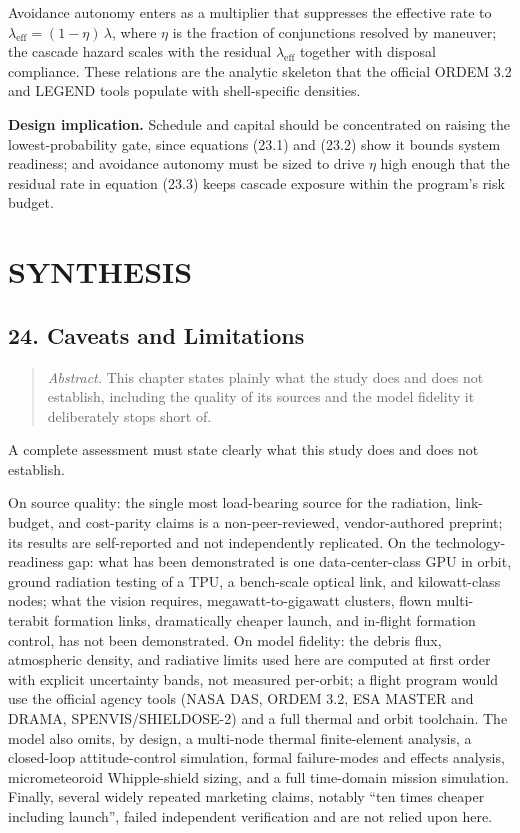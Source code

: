 \documentclass[
  11pt,
  openany,
  oneside]{book}
\begin{document}
Avoidance autonomy enters as a multiplier that suppresses the effective
rate to \(\lambda_{\text{eff}} = (1-\eta)\,\lambda\), where \(\eta\) is
the fraction of conjunctions resolved by maneuver; the cascade hazard
scales with the residual \(\lambda_{\text{eff}}\) together with disposal
compliance. These relations are the analytic skeleton that the official
ORDEM 3.2 and LEGEND tools populate with shell-specific densities.

\textbf{Design implication.} Schedule and capital should be concentrated
on raising the lowest-probability gate, since equations (23.1) and
(23.2) show it bounds system readiness; and avoidance autonomy must be
sized to drive \(\eta\) high enough that the residual rate in equation
(23.3) keeps cascade exposure within the program's risk budget.

\part{SYNTHESIS}\label{synthesis}

\chapter{24. Caveats and Limitations}\label{caveats-and-limitations}

\begin{quote}
\emph{Abstract.} This chapter states plainly what the study does and
does not establish, including the quality of its sources and the model
fidelity it deliberately stops short of.
\end{quote}

A complete assessment must state clearly what this study does and does
not establish.

On source quality: the single most load-bearing source for the
radiation, link-budget, and cost-parity claims is a non-peer-reviewed,
vendor-authored preprint; its results are self-reported and not
independently replicated. On the technology-readiness gap: what has been
demonstrated is one data-center-class GPU in orbit, ground radiation
testing of a TPU, a bench-scale optical link, and kilowatt-class nodes;
what the vision requires, megawatt-to-gigawatt clusters, flown
multi-terabit formation links, dramatically cheaper launch, and
in-flight formation control, has not been demonstrated. On model
fidelity: the debris flux, atmospheric density, and radiative limits
used here are computed at first order with explicit uncertainty bands,
not measured per-orbit; a flight program would use the official agency
tools (NASA DAS, ORDEM 3.2, ESA MASTER and DRAMA, SPENVIS/SHIELDOSE-2)
and a full thermal and orbit toolchain. The model also omits, by design,
a multi-node thermal finite-element analysis, a closed-loop
attitude-control simulation, formal failure-modes and effects analysis,
micrometeoroid Whipple-shield sizing, and a full time-domain mission
simulation. Finally, several widely repeated marketing claims, notably
``ten times cheaper including launch'', failed independent verification
and are not relied upon here.
\end{document}
